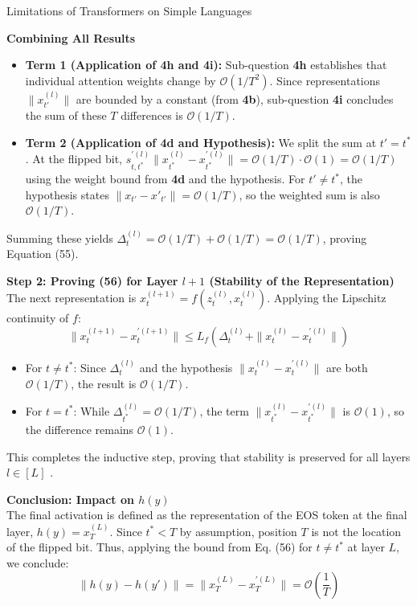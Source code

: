 \begin{question}{Limitations of Transformers on Simple Languages}
\begin{subquestion}{\textbf{Combining All Results}}
\begin{itemize}
    \item \textbf{Term 1 (Application of 4h and 4i):} Sub-question \textbf{4h} establishes that individual attention weights change by $\mathcal{O}(1/T^2)$. Since representations $\|x_{t'}^{(l)}\|$ are bounded by a constant (from \textbf{4b}), sub-question \textbf{4i} concludes the sum of these $T$ differences is $\mathcal{O}(1/T)$.
    \item \textbf{Term 2 (Application of 4d and Hypothesis):} We split the sum at $t'=t^*$. At the flipped bit, $s_{t,t^*}^{\prime(l)} \|x_{t^*}^{(l)} - x_{t^*}^{\prime(l)}\| = \mathcal{O}(1/T) \cdot \mathcal{O}(1) = \mathcal{O}(1/T)$ using the weight bound from \textbf{4d} and the hypothesis. For $t' \neq t^*$, the hypothesis states $\|x_{t'} - x'_{t'}\| = \mathcal{O}(1/T)$, so the weighted sum is also $\mathcal{O}(1/T)$.
\end{itemize}
Summing these yields $\Delta_t^{(l)} = \mathcal{O}(1/T) + \mathcal{O}(1/T) = \mathcal{O}(1/T)$, proving Equation (55).

\textbf{Step 2: Proving (56) for Layer $l+1$ (Stability of the Representation)}
The next representation is $x_t^{(l+1)} = f(z_t^{(l)}, x_t^{(l)})$. Applying the Lipschitz continuity of $f$:
\begin{equation}
\|x_t^{(l+1)} - x_t^{\prime(l+1)}\| \le L_f \left( \Delta_t^{(l)} + \|x_t^{(l)} - x_t^{\prime(l)}\| \right)
\end{equation}
\begin{itemize}
    \item For $t \neq t^*$: Since $\Delta_t^{(l)}$ and the hypothesis $\|x_t^{(l)} - x_t^{\prime(l)}\|$ are both $\mathcal{O}(1/T)$, the result is $\mathcal{O}(1/T)$.
    \item For $t = t^*$: While $\Delta_{t^*}^{(l)} = \mathcal{O}(1/T)$, the term $\|x_{t^*}^{(l)} - x_{t^*}^{\prime(l)}\|$ is $\mathcal{O}(1)$, so the difference remains $\mathcal{O}(1)$.
\end{itemize}
This completes the inductive step, proving that stability is preserved for all layers $l \in [L]$ .

\textbf{Conclusion: Impact on $h(y)$} \\
The final activation is defined as the representation of the EOS token at the final layer, $h(y) = x_T^{(L)}$. Since $t^* < T$ by assumption, position $T$ is not the location of the flipped bit. Thus, applying the bound from Eq. (56) for $t \neq t^*$ at layer $L$, we conclude:
\begin{equation}
\|h(y) - h(y')\| = \|x_T^{(L)} - x_T^{\prime(L)}\| = \mathcal{O}\left(\frac{1}{T}\right)
\end{equation}
\end{subquestion}


\end{question}
